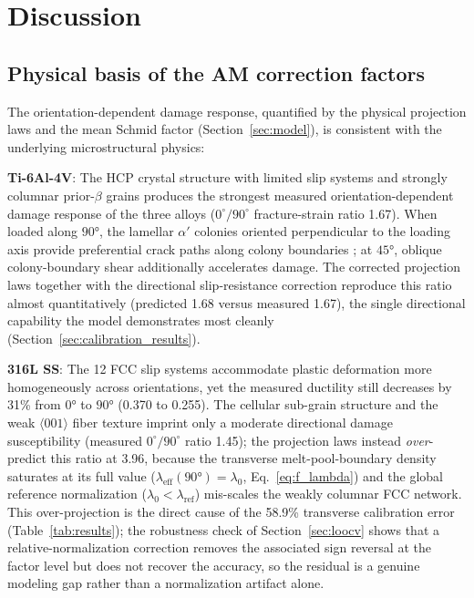 \documentclass[12pt,a4paper,twocolumn]{article}
\begin{document}
\section{Discussion}
\label{sec:discussion}


\subsection{Physical basis of the AM correction factors}
\label{sec:phys_basis}

The orientation-dependent damage response, quantified by the physical projection laws and the mean Schmid factor (Section~\ref{sec:model}), is consistent with the underlying microstructural physics:

\textbf{Ti-6Al-4V}: The HCP crystal structure with limited slip systems and strongly columnar prior-$\beta$ grains produces the strongest measured orientation-dependent damage response of the three alloys ($0^\circ/90^\circ$ fracture-strain ratio 1.67). When loaded along $\ang{90}$, the lamellar $\alpha'$ colonies oriented perpendicular to the loading axis provide preferential crack paths along colony boundaries \cite{carroll2015anisotropic}; at $\ang{45}$, oblique colony-boundary shear additionally accelerates damage. The corrected projection laws together with the directional slip-resistance correction reproduce this ratio almost quantitatively (predicted 1.68 versus measured 1.67), the single directional capability the model demonstrates most cleanly (Section~\ref{sec:calibration_results}).

\textbf{316L SS}: The 12 FCC slip systems accommodate plastic deformation more homogeneously across orientations, yet the measured ductility still decreases by 31\% from $\ang{0}$ to $\ang{90}$ (0.370 to 0.255). The cellular sub-grain structure and the weak $\langle001\rangle$ fiber texture imprint only a moderate directional damage susceptibility (measured $0^\circ/90^\circ$ ratio 1.45); the projection laws instead \emph{over}-predict this ratio at 3.96, because the transverse melt-pool-boundary density saturates at its full value ($\lambda_{\mathrm{eff}}(\ang{90})=\lambda_0$, Eq.~\eqref{eq:f_lambda}) and the global reference normalization ($\lambda_0<\lambda_{\mathrm{ref}}$) mis-scales the weakly columnar FCC network. This over-projection is the direct cause of the 58.9\% transverse calibration error (Table~\ref{tab:results}); the robustness check of Section~\ref{sec:loocv} shows that a relative-normalization correction removes the associated sign reversal at the factor level but does not recover the accuracy, so the residual is a genuine modeling gap rather than a normalization artifact alone.
\end{document}

